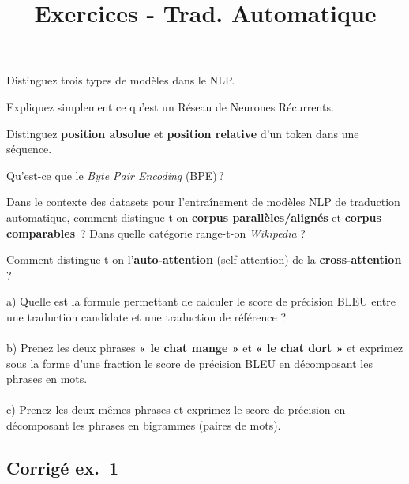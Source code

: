 \documentclass[11pt,a4paper]{article}
\title{Exercices - Trad. Automatique}
\author{}
\date{}
\begin{document}
\maketitle

\begin{description}[
  leftmargin=0pt,
  style=nextline,
  font=\normalfont,
  itemsep=1.0\baselineskip,
  parsep=0pt
]
  \item[\textbf{Exercice 1}] Distinguez trois types de modèles dans le NLP.

  \item[\textbf{Exercice 2}] Expliquez simplement ce qu'est un Réseau de Neurones Récurrents.

  \item[\textbf{Exercice 3}] Distinguez \textbf{position absolue} et \textbf{position relative} d'un token dans une séquence.

  \item[\textbf{Exercice 4}] Qu'est-ce que le \emph{Byte Pair Encoding} (BPE)\,?

  \item[\textbf{Exercice 5}] Dans le contexte des datasets pour l’entraînement de modèles NLP de traduction automatique, comment distingue-t-on \textbf{corpus parallèles/alignés} et \textbf{corpus comparables}~? Dans quelle catégorie range-t-on \textit{Wikipedia} ?

  \item[\textbf{Exercice 6}] Comment distingue-t-on l’\textbf{auto-attention} (self-attention) de la \textbf{cross-attention} ?

  \item[\textbf{Exercice 7}] a) Quelle est la formule permettant de calculer le score de précision BLEU entre une traduction candidate et une traduction de référence ? 
  \\
  \\
  b) Prenez les deux phrases \textbf{« le chat mange »} et \textbf{« le chat dort »} et exprimez sous la forme d'une fraction le score de précision BLEU en décomposant les phrases en mots.
    \\
  \\
  c) Prenez les deux mêmes phrases et exprimez le score de précision en décomposant les phrases en bigrammes (paires de mots).

\clearpage

\subsection*{Corrigé ex.~1}


\end{description}
\end{document}
